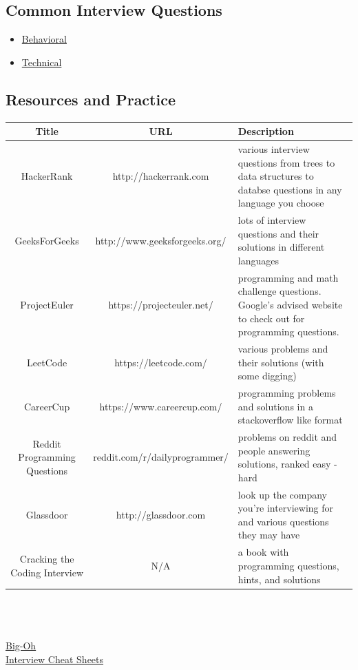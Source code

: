 \documentclass{article}
\begin{document}
\subsection{Common Interview Questions}
\begin{itemize}
    \item \href{http://www.forbes.com/sites/jacquelynsmith/2013/01/11/how-to-ace-the-50-most-common-interview-questions/#f57f0c348737}{Behavioral} 
    \item \href{https://www.reddit.com/r/cscareerquestions/comments/20ahfq/heres_a_pretty_big_list_of_programming_interview/}{Technical}
\end{itemize}
\subsection{Resources and Practice}
\begin{tabular}{|c|c|p{6cm}|}
\hline
    \textbf{Title} & \textbf{URL} & \textbf{Description}  \\
    \hline
    HackerRank & http://hackerrank.com & various interview questions from trees to data structures to databse questions in any language you choose \\
    \hline
    GeeksForGeeks &http://www.geeksforgeeks.org/ & lots of interview questions and their solutions in different languages\\
    \hline
    ProjectEuler & https://projecteuler.net/ & programming and math challenge questions. Google's advised website to check out for programming questions. \\
    \hline
    LeetCode & https://leetcode.com/ & various problems and their solutions (with some digging) \\
    \hline
    CareerCup & https://www.careercup.com/ & programming problems and solutions in a stackoverflow like format\\
    \hline
    Reddit Programming Questions & reddit.com/r/dailyprogrammer/ & problems on reddit and people answering solutions, ranked easy - hard\\
    \hline
    Glassdoor & http://glassdoor.com & look up the company you're interviewing for and various questions they may have \\
    \hline
    Cracking the Coding Interview & N/A & a book with programming questions, hints, and solutions  \\
    \hline
\end{tabular} \\ \\ \\
\href{http://bigocheatsheet.com/}{Big-Oh}\\
\href{https://gist.github.com/TSiege/cbb0507082bb18ff7e4b}{Interview Cheat Sheets}
\end{document}
